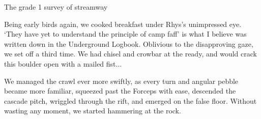 \begin{survey}[t!]
\checkoddpage \ifoddpage \forcerectofloat \else \forceversofloat \fi
\centering
{}
\caption[A Pun Too Far  grade 1]{The grade 1 survey of \protect{} streamway  }
\label{map:pun too far}
\end{survey}

Being early birds again, we cooked breakfast under Rhys's unimpressed eye. `They have yet to understand the principle of camp faff' is what I believe was written down in the Underground Logbook. Oblivious to the disapproving gaze, we set off a third time. We had chisel and crowbar at the ready, and would crack this boulder open with a mailed fist...

We managed the crawl ever more swiftly, as every turn and angular pebble became more familiar, squeezed past the Forceps with ease, descended the cascade pitch, wriggled through the rift, and emerged on the false floor. Without wasting any moment, we started hammering at the rock. 

